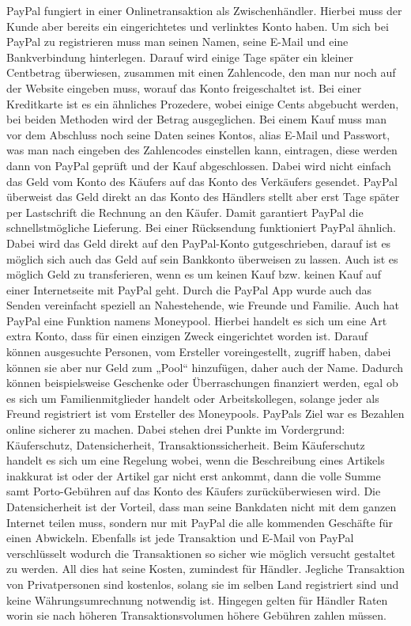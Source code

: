  
PayPal fungiert in einer Onlinetransaktion als Zwischenhändler. Hierbei muss der Kunde aber bereits ein eingerichtetes und verlinktes Konto haben. Um sich bei PayPal zu registrieren muss man seinen Namen, seine E-Mail und eine Bankverbindung hinterlegen. Darauf wird einige Tage später ein kleiner Centbetrag überwiesen, zusammen mit einen Zahlencode, den man nur noch auf der Website eingeben muss, worauf das Konto freigeschaltet ist. Bei einer Kreditkarte ist es ein ähnliches Prozedere, wobei einige Cents abgebucht werden, bei beiden Methoden wird der Betrag ausgeglichen. Bei einem Kauf muss man vor dem Abschluss noch seine Daten seines Kontos, alias E-Mail und Passwort, was man nach eingeben des Zahlencodes einstellen kann, eintragen, diese werden dann von PayPal geprüft und der Kauf abgeschlossen. Dabei wird nicht einfach das Geld vom Konto des Käufers auf das Konto des Verkäufers gesendet. PayPal überweist das Geld direkt an das Konto des Händlers stellt aber erst Tage später per Lastschrift die Rechnung an den Käufer. Damit garantiert PayPal die schnellstmögliche Lieferung. Bei einer Rücksendung funktioniert PayPal ähnlich. Dabei wird das Geld direkt auf den PayPal-Konto gutgeschrieben, darauf ist es möglich sich auch das Geld auf sein Bankkonto überweisen zu lassen. Auch ist es möglich Geld zu transferieren, wenn es um keinen Kauf bzw. keinen Kauf auf einer Internetseite mit PayPal geht. Durch die PayPal App wurde auch das Senden vereinfacht speziell an Nahestehende, wie Freunde und Familie. Auch hat PayPal eine Funktion namens Moneypool. Hierbei handelt es sich um eine Art extra Konto, dass für einen einzigen Zweck eingerichtet worden ist. Darauf können ausgesuchte Personen, vom Ersteller voreingestellt, zugriff haben, dabei können sie aber nur Geld zum „Pool“ hinzufügen, daher auch der Name. Dadurch können beispielsweise Geschenke oder Überraschungen finanziert werden, egal ob es sich um Familienmitglieder handelt oder Arbeitskollegen, solange jeder als Freund registriert ist vom Ersteller des Moneypools. PayPals Ziel war es Bezahlen online sicherer zu machen. Dabei stehen drei Punkte im Vordergrund: Käuferschutz, Datensicherheit, Transaktionssicherheit. Beim Käuferschutz handelt es sich um eine Regelung wobei, wenn die Beschreibung eines Artikels inakkurat ist oder der Artikel gar nicht erst ankommt, dann die volle Summe samt Porto-Gebühren auf das Konto des Käufers zurücküberwiesen wird. Die Datensicherheit ist der Vorteil, dass man seine Bankdaten nicht mit dem ganzen Internet teilen muss, sondern nur mit PayPal die alle kommenden Geschäfte für einen Abwickeln. Ebenfalls ist jede Transaktion und E-Mail von PayPal verschlüsselt wodurch die Transaktionen so sicher wie möglich versucht gestaltet zu werden. All dies hat seine Kosten, zumindest für Händler. Jegliche Transaktion von Privatpersonen sind kostenlos, solang sie im selben Land registriert sind und keine Währungsumrechnung notwendig ist. Hingegen gelten für Händler Raten worin sie nach höheren Transaktionsvolumen höhere Gebühren zahlen müssen.
